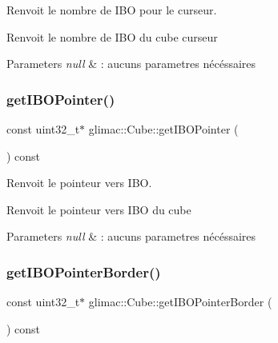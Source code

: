 Renvoit le nombre de I\+BO pour le curseur. 

Renvoit le nombre de I\+BO du cube curseur


\begin{DoxyParams}{Parameters}
{\em null} & \+: aucuns parametres nécéssaires \\
\hline
\end{DoxyParams}
\mbox{\label{classglimac_1_1Cube_a71a64cda0b1ed4f733d9d8132b2866b4}} 
\subsubsection{\texorpdfstring{get\+I\+B\+O\+Pointer()}{getIBOPointer()}}
{\footnotesize\ttfamily const uint32\+\_\+t$\ast$ glimac\+::\+Cube\+::get\+I\+B\+O\+Pointer (\begin{DoxyParamCaption}{ }\end{DoxyParamCaption}) const\hspace{0.3cm}{\ttfamily [inline]}}



Renvoit le pointeur vers I\+BO. 

Renvoit le pointeur vers I\+BO du cube


\begin{DoxyParams}{Parameters}
{\em null} & \+: aucuns parametres nécéssaires \\
\hline
\end{DoxyParams}
\mbox{\label{classglimac_1_1Cube_a93dd4105228440066a216b95697648ad}} 
\subsubsection{\texorpdfstring{get\+I\+B\+O\+Pointer\+Border()}{getIBOPointerBorder()}}
{\footnotesize\ttfamily const uint32\+\_\+t$\ast$ glimac\+::\+Cube\+::get\+I\+B\+O\+Pointer\+Border (\begin{DoxyParamCaption}{ }\end{DoxyParamCaption}) const\hspace{0.3cm}{\ttfamily [inline]}}



